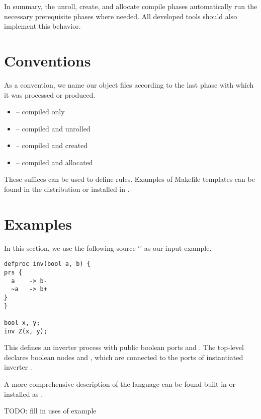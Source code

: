 In summary, 
the unroll, create, and allocate compile phases 
automatically run the necessary prerequisite phases where needed.  
All developed tools should also implement this behavior.  


\section{Conventions}
\label{sec:compiler:conventions}

As a convention, we name our object files according to the last
phase with which it was processed or produced.  

\begin{itemize}
\item {} -- compiled only
\item {} -- compiled and unrolled
\item {} -- compiled and created
\item {} -- compiled and allocated
\end{itemize}

These suffices can be used to define  rules.  
Examples of Makefile templates can be found in the distribution
 or installed in .

\section{Examples}
\label{sec:compiler:examples}

In this section, we use the following source `' 
as our input example.  

\begin{verbatim}
defproc inv(bool a, b) {
prs {
  a    -> b-
  ~a   -> b+
}
}

bool x, y;
inv Z(x, y);
\end{verbatim}

This defines an inverter process  with public boolean ports
 and .  
The top-level declares boolean nodes  and , 
which are connected to the ports of instantiated inverter .  

A more comprehensive description of the language can be found built in
 or installed as .  

TODO: fill in uses of example
